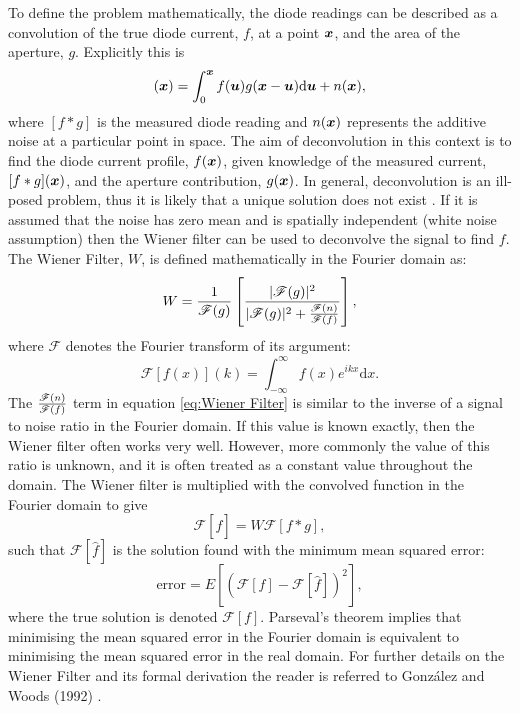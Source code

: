 To define the problem mathematically, the diode readings can be described as a convolution of the true diode current, $f$, at a point $\boldsymbol{x}$, and the area of the aperture, $g$.
Explicitly this is
\begin{equation}
[f*g](\bs{x}) = \int_0^{\bs{x}} f(\bs{u})g(\bs{x}-\bs{u})\mathrm{d}\bs{u} + n(\bs{x}),
\label{eq:Convolution equation with noise}
\end{equation}
where $[f*g]$ is the measured diode reading and $n(\boldsymbol{x})$ represents the additive noise at a particular point in space.
The aim of deconvolution in this context is to find the diode current profile, $f(\boldsymbol{x})$, given knowledge of the measured current, $[f*g](\boldsymbol{x})$, and the aperture contribution, $g(\boldsymbol{x})$.
In general, deconvolution is an ill-posed problem, thus it is likely that a unique solution does not exist \cite{wolfram2016Deconvolution}.
If it is assumed that the noise has zero mean and is spatially independent (white noise assumption) then the Wiener filter \cite{wiener1949extrapolation} can be used to deconvolve the signal to find $f$.
The Wiener Filter, $W$, is defined mathematically in the Fourier domain as:
\begin{equation}
W = \frac{1}{\mathscr{F}(g)}\left[\frac{|\mathscr{F}(g)|^2}{|\mathscr{F}(g)|^2 + \frac{\mathscr{F}(n)}{\mathscr{F}(f)}}\right],
\label{eq:Wiener Filter}
\end{equation}
where $\mathscr{F}$ denotes the Fourier transform of its argument:
\begin{equation}
\mathscr{F}[f(x)](k) = \int_{-\infty}^{\infty} \! f(x) e^{ikx} \mathrm{d}x.
\label{eq:Classic Fourier Transform}
\end{equation}
The $\frac{\mathscr{F}(n)}{\mathscr{F}(f)}$ term in equation \ref{eq:Wiener Filter} is similar to the inverse of a signal to noise ratio in the Fourier domain.
If this value is known exactly, then the Wiener filter often works very well.
However, more commonly the value of this ratio is unknown, and it is often treated as a constant value throughout the domain.
\newline
The Wiener filter is multiplied with the convolved function in the Fourier domain to give
\begin{equation}
\mathscr{F}[\widehat{f}] = W \mathscr{F}[f*g],
\label{eqwienapp}
\end{equation}
such that $\mathscr{F}[\widehat{f}]$ is the solution found with the minimum mean squared error:
\begin{equation}
\text{error} = E\left[ \left(\mathscr{F}[f]-\mathscr{F}[\widehat{f}]\right)^2\right],
\label{eqerr}
\end{equation}
where the true solution is denoted $\mathscr{F}[f]$.
Parseval's theorem implies that minimising the mean squared error in the Fourier domain is equivalent to minimising the mean squared error in the real domain. For further details on the Wiener Filter and its formal derivation the reader is referred to Gonz\'{a}lez and Woods (1992) \nocite{gon1992}.

